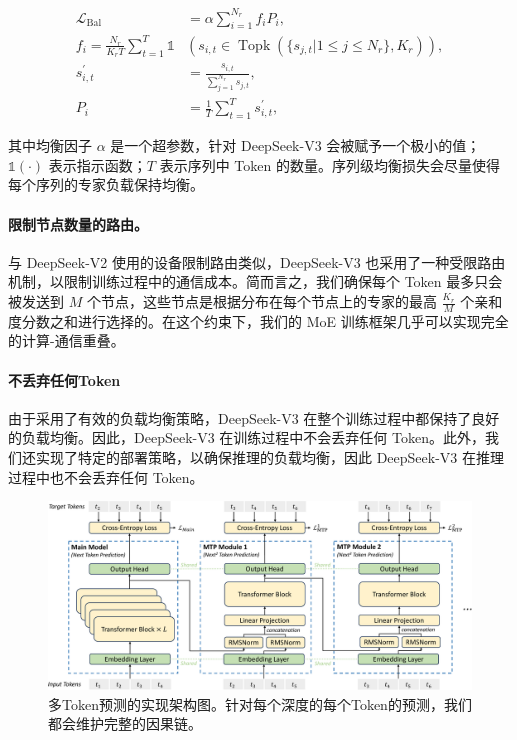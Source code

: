\documentclass[lang=cn,a4paper,newtx]{elegantpaper}
\newcommand{\dsvii}{DeepSeek-V2}
\newcommand{\dsviii}{DeepSeek-V3}
\begin{document}
\begin{align}
    \mathcal{L}_{\mathrm{Bal}} & = \alpha \sum_{i=1}^{N_r}{f_i P_i}, \\
    f_i = \frac{N_r}{K_r T} \sum_{t=1}^{T} \mathds{1} & \left( s_{i,t} \in \operatorname{Topk} ( \{ s_{j, t} | 1 \leq j \leq N_r \}, K_{r} ) \right), \\
    s^{\prime}_{i,t} & = \frac{s_{i,t}}{\sum_{j=1}^{N_r} s_{j,t}}, \\
    P_i & = \frac{1}{T} \sum_{t=1}^{T}{s^{\prime}_{i,t}},
\end{align}

其中均衡因子 $\alpha$ 是一个超参数，针对 \dsviii{} 会被赋予一个极小的值；$\mathds{1}(\cdot)$ 表示指示函数；$T$ 表示序列中 Token 的数量。序列级均衡损失会尽量使得每个序列的专家负载保持均衡。

\paragraph{限制节点数量的路由。}
与 \dsvii{} 使用的设备限制路由类似，\dsviii{} 也采用了一种受限路由机制，以限制训练过程中的通信成本。简而言之，我们确保每个 Token 最多只会被发送到 $M$ 个节点，这些节点是根据分布在每个节点上的专家的最高 $\frac{K_r}{M}$ 个亲和度分数之和进行选择的。在这个约束下，我们的 MoE 训练框架几乎可以实现完全的计算-通信重叠。

\paragraph{不丢弃任何Token}
由于采用了有效的负载均衡策略，\dsviii{} 在整个训练过程中都保持了良好的负载均衡。因此，\dsviii{} 在训练过程中不会丢弃任何 Token。此外，我们还实现了特定的部署策略，以确保推理的负载均衡，因此 \dsviii{} 在推理过程中也不会丢弃任何 Token。

\begin{figure}[!t]
\centering
\includegraphics[width=0.99\linewidth]{figures/nextn.pdf}
\caption{多Token预测的实现架构图。针对每个深度的每个Token的预测，我们都会维护完整的因果链。}
\label{fig:nextn}
\end{figure}
\end{document}

